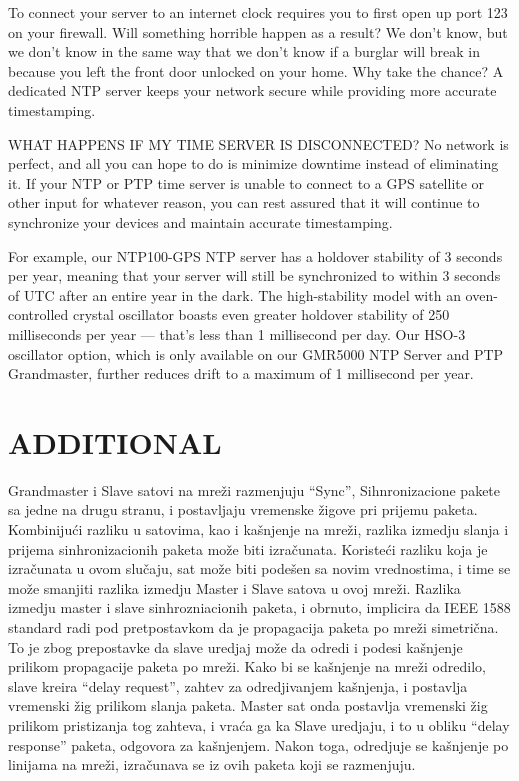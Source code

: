 \documentclass[a4paper,12pt, master]{etf}
\begin{document}
	To connect your server to an internet clock requires you to first open up port 123 on
	your firewall. Will something horrible happen as a result? We don't know, but we don't
	know in the same way that we don't know if a burglar will break in because you left the
	front door unlocked on your home. Why take the chance? A dedicated NTP server keeps your
	network secure while providing more accurate timestamping.

	WHAT HAPPENS IF MY TIME SERVER IS DISCONNECTED\@?
	No network is perfect, and all you can hope to do is minimize downtime instead of
	eliminating it. If your NTP or PTP time server is unable to connect to a GPS satellite or
	other input for whatever reason, you can rest assured that it will continue to
	synchronize your devices and maintain accurate timestamping.

	For example, our NTP100-GPS NTP server has a holdover stability of 3 seconds per year,
	meaning that your server will still be synchronized to within 3 seconds of UTC after an
	entire year in the dark. The high-stability model with an oven-controlled crystal
	oscillator boasts even greater holdover stability of 250 milliseconds per year — that's
	less than 1 millisecond per day. Our HSO-3 oscillator option, which is only available on
	our GMR5000 NTP Server and PTP Grandmaster, further reduces drift to a maximum of 1
	millisecond per year.

	\newpage

	\chapter{ADDITIONAL}

	Grandmaster i Slave satovi na mre\v{z}i razmenjuju ``Sync'', Sihnronizacione pakete sa jedne na
	drugu stranu, i postavljaju vremenske \v{z}igove pri prijemu paketa. Kombiniju\'{c}i razliku u
	satovima, kao i ka\v{s}njenje na mre\v{z}i, razlika izmedju slanja i prijema sinhronizacionih
	paketa mo\v{z}e biti izra\v{c}unata. Koriste\'{c}i razliku koja je izra\v{c}unata u ovom slu\v{c}aju, sat
	mo\v{z}e biti pode\v{s}en sa novim vrednostima, i time se mo\v{z}e smanjiti razlika izmedju Master i
	Slave satova u ovoj mre\v{z}i. Razlika izmedju master i slave sinhrozniacionih paketa, i
	obrnuto, implicira da IEEE 1588 standard radi pod pretpostavkom da je propagacija paketa
	po mre\v{z}i simetri\v{c}na. To je zbog prepostavke da slave uredjaj mo\v{z}e da odredi i podesi
	ka\v{s}njenje prilikom propagacije paketa po mre\v{z}i. Kako bi se ka\v{s}njenje na mre\v{z}i odredilo,
	slave kreira ``delay request'', zahtev za odredjivanjem ka\v{s}njenja, i postavlja vremenski
	\v{z}ig prilikom slanja paketa. Master sat onda postavlja vremenski \v{z}ig prilikom pristizanja
	tog zahteva, i vra\'{c}a ga ka Slave uredjaju, i to u obliku ``delay response'' paketa, odgovora za
        ka\v{s}njenjem. Nakon toga, odredjuje se ka\v{s}njenje po linijama na mre\v{z}i, izra\v{c}unava
        se iz ovih paketa koji se razmenjuju.
\end{document}
